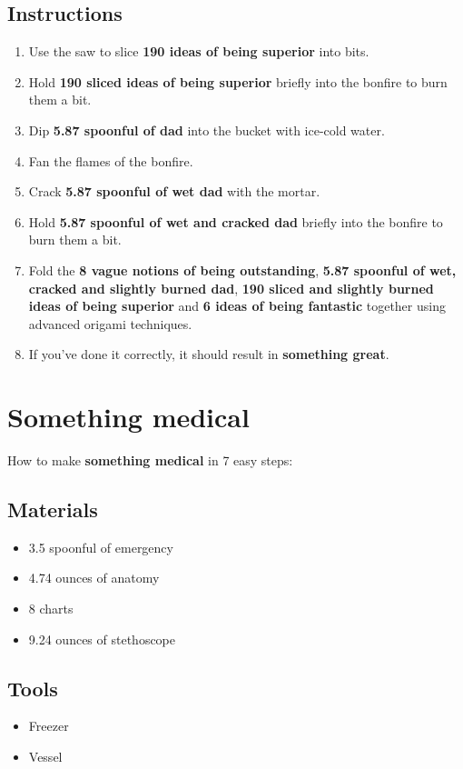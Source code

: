 \documentclass{article}
\begin{document}
\subsection{Instructions}\begin{enumerate}
\item 
Use the saw to slice \textbf{190 ideas of being superior} into bits.
\item 
Hold \textbf{190 sliced ideas of being superior} briefly into the bonfire to burn them a bit.
\item 
Dip \textbf{5.87 spoonful of dad} into the bucket with ice-cold water.
\item 
Fan the flames of the bonfire.
\item 
Crack \textbf{5.87 spoonful of wet dad} with the mortar.
\item 
Hold \textbf{5.87 spoonful of wet and cracked dad} briefly into the bonfire to burn them a bit.
\item 
Fold the \textbf{8 vague notions of being outstanding}, \textbf{5.87 spoonful of wet, cracked and slightly burned dad}, \textbf{190 sliced and slightly burned ideas of being superior} and \textbf{6 ideas of being fantastic} together using advanced origami techniques.
\item 
If you've done it correctly, it should result in \textbf{something great}.
\end{enumerate}
\newpage
\section{Something medical}How to make \textbf{something medical} in 7 easy steps:

\subsection{Materials}\begin{itemize}
\item 
3.5 spoonful of emergency
\item 
4.74 ounces of anatomy
\item 
8 charts
\item 
9.24 ounces of stethoscope
\end{itemize}
\subsection{Tools}\begin{itemize}
\item 
Freezer
\item 
Vessel
\end{itemize}
\end{document}
